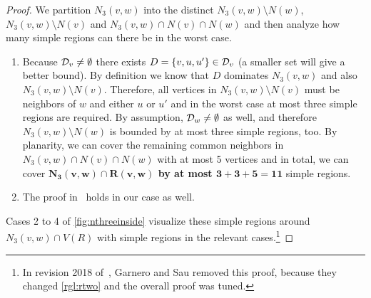 \begin{proof}
        We partition $N_3(v,w)$ into the distinct $N_3(v,w) \setminus N(w)$, $N_3(v,w) \setminus N(v)$ and $N_3(v,w) \cap N(v) \cap N(w)$ and then analyze how many simple regions can there be in the worst case.

    \begin{enumerate}
        \item Because $\mathcal{D}_{v} \neq \emptyset$ there exists $D = \{v,u,u'\} \in \mathcal{D}_{v}$ (a smaller set will give a better bound). 
        By definition we know that $D$ dominates $N_3(v,w)$ and also $N_3(v,w) \setminus N(v)$. 
        Therefore, all vertices in $N_3(v,w) \setminus N(v)$ must be neighbors of $w$ and either $u$ or $u'$ and in the worst case at most three simple regions are required. 
        By assumption, $\mathcal{D}_{w} \neq \emptyset$ as well, and therefore $N_3(v,w) \setminus N(w)$ is bounded by at most three simple regions, too.
        By planarity, we can cover the remaining common neighbors in $N_3(v,w) \cap N(v) \cap N(w)$ with at most 5 vertices and in total, we can cover \textbf{$\mathbf{N_3(v,w) \cap R(v,w)}$ by at most $\mathbf{3 + 3 +5 = 11}$} simple regions.

        \item The proof in~\cite{Garnero2018} holds in our case as well.

    
    \end{enumerate}

    Cases 2 to 4 of \cref{fig:nthreeinside} visualize these simple regions around $N_3(v,w) \cap V(R)$ with simple regions in the relevant cases.\footnote{In revision 2018 of~\cite{Garnero2018}, Garnero and Sau removed this proof, because they changed \cref{rgl:rtwo} and the overall proof was tuned.}
    
\end{proof}


